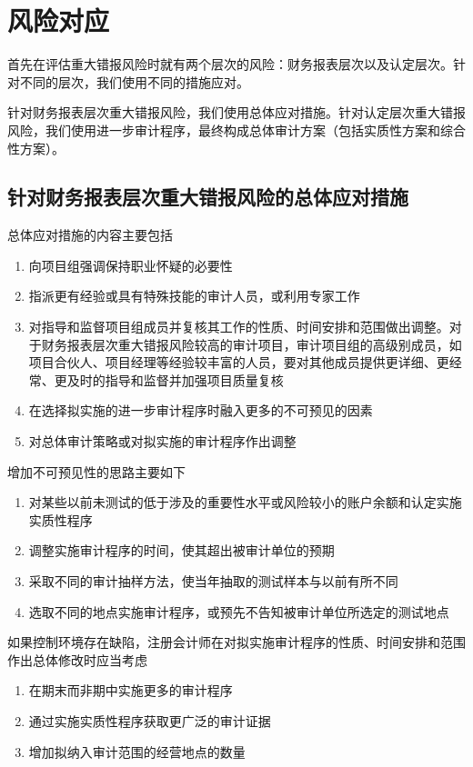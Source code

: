 \documentclass[UTF8,12pt]{ctexart}
\numberwithin{equation}{section} %
\numberwithin{figure}{section}
\numberwithin{table}{section}
\begin{document}
	\newpage
	\section{风险对应}
	首先在评估重大错报风险时就有两个层次的风险：财务报表层次以及认定层次。针对不同的层次，我们使用不同的措施应对。
	
	针对财务报表层次重大错报风险，我们使用总体应对措施。针对认定层次重大错报风险，我们使用进一步审计程序，最终构成总体审计方案（包括实质性方案和综合性方案）。
	
	\subsection{针对财务报表层次重大错报风险的总体应对措施}
	总体应对措施的内容主要包括
	\begin{enumerate}
		\item 向项目组强调保持职业怀疑的必要性
		
		\item 指派更有经验或具有特殊技能的审计人员，或利用专家工作
		
		\item 对指导和监督项目组成员并复核其工作的性质、时间安排和范围做出调整。对于财务报表层次重大错报风险较高的审计项目，审计项目组的高级别成员，如项目合伙人、项目经理等经验较丰富的人员，要对其他成员提供更详细、更经常、更及时的指导和监督并加强项目质量复核
		
		\item 在选择拟实施的进一步审计程序时融入更多的不可预见的因素
		
		\item 对总体审计策略或对拟实施的审计程序作出调整
	\end{enumerate}
	
	增加不可预见性的思路主要如下
	\begin{enumerate}
		\item 对某些以前未测试的低于涉及的重要性水平或风险较小的账户余额和认定实施实质性程序
		
		\item 调整实施审计程序的时间，使其超出被审计单位的预期
		
		\item 采取不同的审计抽样方法，使当年抽取的测试样本与以前有所不同
		
		\item 选取不同的地点实施审计程序，或预先不告知被审计单位所选定的测试地点
	\end{enumerate}
	
	如果控制环境存在缺陷，注册会计师在对拟实施审计程序的性质、时间安排和范围作出总体修改时应当考虑
	\begin{enumerate}
		\item 在期末而非期中实施更多的审计程序
		
		\item 通过实施实质性程序获取更广泛的审计证据
		
		\item 增加拟纳入审计范围的经营地点的数量
	\end{enumerate}
	
\end{document}
